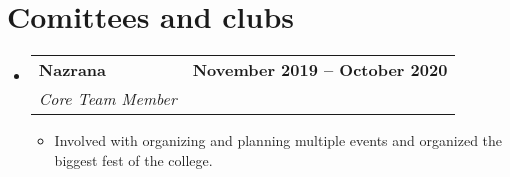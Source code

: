 \documentclass[letterpaper,11pt]{article}
\makeatletter
\newcommand{\resumeItem}[1]{
  \item\small{
    {#1 \vspace{-2pt}}
  }
}
\newcommand{\resumeSubheading}[4]{
  \vspace{-2pt}\item
    \begin{tabular*}{1.0\textwidth}[t]{l@{\extracolsep{\fill}}r}
      \vspace{-2pt}\textbf{#1} & \textbf{\small #2} \\
      \textit{\small#3} & \textit{\small #4} \\
    \end{tabular*}\vspace{-7pt}
}
\newcommand{\resumeSubHeadingListStart}{\begin{itemize}[leftmargin=0.0in, label={}]}
\newcommand{\resumeSubHeadingListEnd}{\end{itemize}}
\newcommand{\resumeItemListStart}{\begin{itemize}}
\newcommand{\resumeItemListEnd}{\end{itemize}\vspace{-5pt}}
\makeatother
\begin{document}
\vspace{-8pt}

\section{Comittees and clubs}
    \vspace{-2pt}
    \resumeSubHeadingListStart
        \resumeSubheading
            {Nazrana}{November 2019 -- October 2020}
            {Core Team Member}{}
            \vspace{-7pt}
            \resumeItemListStart
                \resumeItem{Involved with organizing and planning multiple  events and organized the biggest fest of the college.}
            \resumeItemListEnd
            \vspace{-4pt}

    \resumeSubHeadingListEnd
\vspace{-8pt}
\end{document}
